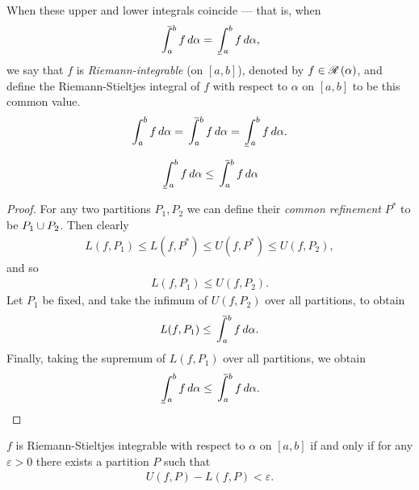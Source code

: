 \begin{defn}
    When these upper and lower integrals coincide --- that is, when
    \begin{align*}
        \upperint_{a}^{b}f\,d\alpha = \lowerint_{a}^{b}f\,d\alpha,
    \end{align*}
    we say that $f$ is \emph{Riemann-integrable} (on $[a, b]$), denoted by $f \in \mathscr{R}\left({\alpha}\right)$, and define the Riemann-Stieltjes integral of $f$ with respect to $\alpha$ on $[a, b]$ to be this common value. 
    \begin{align*}
        \int_{a}^{b}f\,d\alpha = \upperint_{a}^{b}f\,d\alpha = \lowerint_{a}^{b}f\,d\alpha.
    \end{align*}
\end{defn}

\begin{thm}
    \begin{align*}
        \lowerint_{a}^{b}f\,d\alpha \leq \upperint_{a}^{b}f\,d\alpha
    \end{align*}
\end{thm}

\begin{proof}
    For any two partitions $P_1, P_2$ we can define their \emph{common refinement} $P^{*}$ to be $P_1 \cup P_2$. Then clearly
    \begin{align*}
        L(f, P_1) \leq L(f, P^{*}) \leq U(f, P^{*}) \leq U(f, P_2),
    \end{align*}
    and so
    \begin{align*}
        L(f, P_1) \leq U(f, P_2).
    \end{align*}
    Let $P_1$ be fixed, and take the infimum of $U(f, P_2)$ over all partitions, to obtain
    \begin{align*}
        L(f, P_1) \leq \upperint_{a}^{b}f\,d\alpha.
    \end{align*}
    Finally, taking the supremum of $L(f, P_1)$ over all partitions, we obtain
    \begin{align*}
        \lowerint_{a}^{b}f\,d\alpha \leq \upperint_{a}^{b}f\,d\alpha.   
    \end{align*}
\end{proof}

\begin{thm}
    $f$ is Riemann-Stieltjes integrable with respect to $\alpha$ on $[a, b]$ if and only if for any $\varepsilon > 0$ there exists a partition $P$ such that
    \begin{align*}
        U(f, P) - L(f, P) < \varepsilon.
    \end{align*}
\end{thm}

